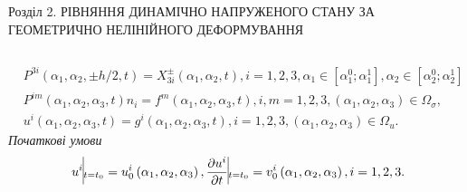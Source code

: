\documentclass[handout, 8pt]{beamer}
\numberwithin{figure}{section}
\numberwithin{equation}{section}
\numberwithin{table}{section}
\begin{document}
\begin{frame}{Розділ 2. РІВНЯННЯ ДИНАМІЧНО НАПРУЖЕНОГО СТАНУ ЗА ГЕОМЕТРИЧНО НЕЛІНІЙНОГО ДЕФОРМУВАННЯ}
\begin{columns}
\begin{align}
&P^{3i}\left( \alpha_1, \alpha_2, \pm h/2, t \right) = X^{\pm}_{3i}\left( \alpha_1, \alpha_2, t \right),i=1,2,3, \alpha_1\in\left[\alpha_1^0;\alpha_1^1\right],\alpha_2\in\left[\alpha_2^0;\alpha_2^1\right]\\
&P^{im}\left( \alpha_1, \alpha_2, \alpha_3, t \right)n_i = f^{m}\left( \alpha_1, \alpha_2, \alpha_3, t \right), i,m=1,2,3, \left( \alpha_1, \alpha_2,\alpha_3\right)\in\Omega_{\sigma},\\
&u^{i}\left( \alpha_1, \alpha_2, \alpha_3, t \right) =g^{i}\left( \alpha_1, \alpha_2, \alpha_3, t \right), i=1,2,3, \left( \alpha_1, \alpha_2,\alpha_3\right)\in\Omega_{u}.
\end{align}
\emph{Початкові умови}
\begin{equation}
u^{i}\vline _{t=t_0} = u^i_0 \left( \alpha_1, \alpha_2, \alpha_3 \right), \frac{\partial u^{i}}{\partial t}\vline _{t=t_0} =v^i_0 \left( \alpha_1, \alpha_2, \alpha_3 \right), i=1,2,3.
\end{equation}
  \end{columns}
\end{frame}
\end{document}
